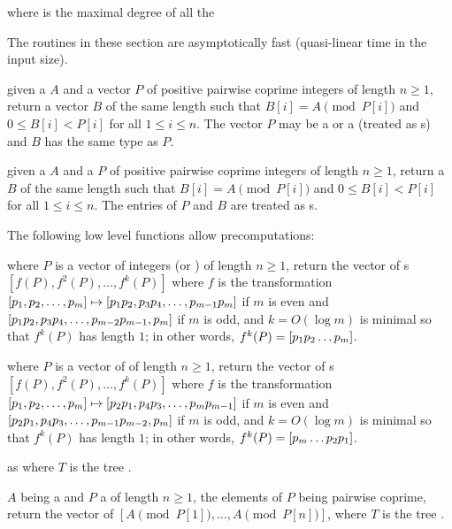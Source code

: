  where 
is the maximal degree of all the 



The routines in these section are asymptotically fast (quasi-linear time in
the input size).

 given a  $A$ and a vector $P$ of
positive pairwise coprime integers of length $n\ge 1$, return a vector $B$ of
the same length such that $B[i] = A\pmod{P[i]}$ and $0\leq B[i] < P[i]$ for
all $1\leq i\leq n$. The vector $P$ may be a  or a 
(treated as s) and $B$ has the same type as $P$.

 given a  $A$ and a 
$P$ of positive pairwise coprime integers of length $n\ge 1$, return a
 $B$ of the same length such that $B[i]=A\pmod{P[i]}$ and
$0\leq B[i] < P[i]$ for all $1\leq i\leq n$. The entries of $P$ and $B$ are
treated as s.

The following low level functions allow precomputations:

 where $P$ is a vector of integers (or
) of length $n\ge 1$, return the vector of s
$[f(P),f^2(P),\ldots,f^k(P)]$ where $f$ is the transformation
$[p_1,p_2,\ldots,p_m] \mapsto [p_1\*p_2,p_3\*p_4,\ldots,p_{m-1}\*p_m]$ if $m$
is even and $[p_1\*p_2,p_3\*p_4,\ldots,p_{m-2}\*p_{m-1},p_m]$ if $m$ is odd,
and $k = O(\log m)$ is minimal so that $f^k(P)$ has length $1$; in other
words, $f^k(P) = [p_1\*p_2\*\ldots\*p_m]$.

 where $P$ is a vector of 
of length $n\ge 1$, return the vector of s
$[f(P),f^2(P),\ldots,f^k(P)]$ where $f$ is the transformation
$[p_1,p_2,\ldots,p_m] \mapsto [p_2\*p_1,p_4\*p_3,\ldots,p_m\*p_{m-1}]$ if $m$
is even and $[p_2\*p_1,p_4\*p_3,\ldots,p_{m-1}\*p_{m-2},p_m]$ if $m$ is odd,
and $k = O(\log m)$ is minimal so that $f^k(P)$ has length $1$; in other
words, $f^k(P) = [p_m\*\ldots\*p_2\*p_1]$.


as  where $T$ is the tree .

 $A$ being a 
and $P$ a  of length $n\ge 1$, the elements of $P$ being
pairwise coprime, return the vector of 
$[A \pmod{P[1]},\ldots,A \pmod{P[n]}]$,
where $T$ is the tree .

